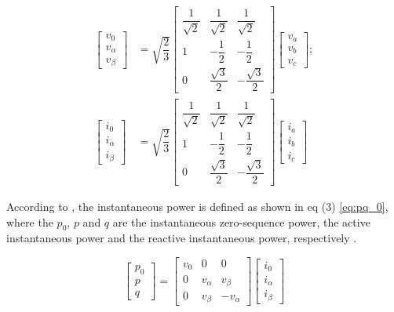 \begin{equation}
\begin{aligned}
\begin{bmatrix}
v_0\\
v_\alpha\\
v_\beta
\end{bmatrix}
& = \sqrt{\dfrac{2}{3}}
\begin{bmatrix}
\dfrac{1}{\sqrt{2}}	& \dfrac{1}{\sqrt{2}}	& \dfrac{1}{\sqrt{2}}		\\[2ex]
1					& -\dfrac{1}{2}			& -\dfrac{1}{2}				\\[2ex]
0					& \dfrac{\sqrt{3}}{2}	& -\dfrac{\sqrt{3}}{2}
\end{bmatrix}
\begin{bmatrix}
v_a\\
v_b\\
v_c
\end{bmatrix}
;\\
\begin{bmatrix}
i_0\\
i_\alpha\\
i_\beta
\end{bmatrix}
& = \sqrt{\dfrac{2}{3}}
\begin{bmatrix}
\dfrac{1}{\sqrt{2}}	& \dfrac{1}{\sqrt{2}}	& \dfrac{1}{\sqrt{2}}		\\[2ex]
1					& -\dfrac{1}{2}			& -\dfrac{1}{2}				\\[2ex]
0					& \dfrac{\sqrt{3}}{2}	& -\dfrac{\sqrt{3}}{2}
\end{bmatrix}
\begin{bmatrix}
i_a\\
i_b\\
i_c
\end{bmatrix}
\label{eq:Clarke}
\end{aligned}
\end{equation} 

According to \cite{Akagi}, the instantaneous power is defined as shown in eq (3) \ref{eq:pq_0}, where the $p_0$, $p$ and $q$ are the instantaneous zero-sequence power, the active instantaneous power and the reactive instantaneous power, respectively \cite{Akagi,Peng1996}.

\begin{equation}
\begin{bmatrix}
p_0\\
p\\
q
\end{bmatrix}=
\begin{bmatrix}
v_0		&	0			&	0\\
0		&	v_{\alpha}	&	v_{\beta}\\
0		&	v_{\beta}	&	-v_{\alpha}
\end{bmatrix}
\begin{bmatrix}
i_{0}\\
i_{\alpha}\\
i_{\beta}
\end{bmatrix}
\label{eq:pq_0}
\end{equation} 

